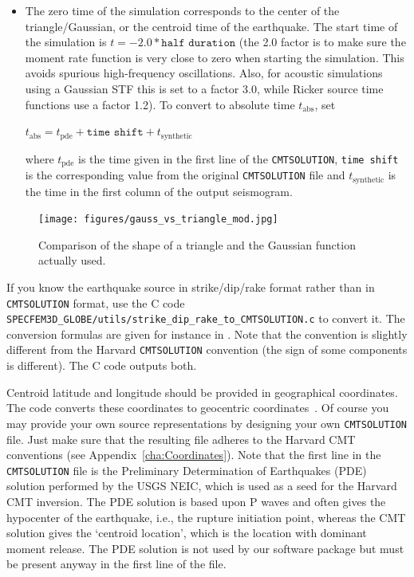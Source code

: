 \begin{itemize}
\item The zero time of the simulation corresponds to the center of the triangle/Gaussian,
or the centroid time of the earthquake. The start time of the simulation
is $t=-2.0*\texttt{half duration}$ (the 2.0 factor is to make sure the moment
rate function is very close to zero when starting the simulation. This avoids spurious high-frequency oscillations.
Also, for acoustic simulations using a Gaussian STF this is set to a factor 3.0, while Ricker source time functions use a factor 1.2).
To convert to absolute time $t_{\mathrm{abs}}$, set
%
\begin{lyxcode}
$t_{\mathrm{abs}}=t_{\mathrm{pde}}+\texttt{time shift}+t_{\mathrm{synthetic}}$
\end{lyxcode}

where $t_{\mathrm{pde}}$ is the time given in the first line of the
\texttt{CMTSOLUTION}, \texttt{time shift} is the corresponding value
from the original \texttt{CMTSOLUTION} file and $t_{\mathrm{synthetic}}$
is the time in the first column of the output seismogram.
\end{itemize}
%
\begin{figure}[htp]
\begin{centering}
\texttt{[image: figures/gauss\_vs\_triangle\_mod.jpg]}
\par
\end{centering}
\caption{Comparison of the shape of a triangle and the Gaussian function actually used.}
\label{fig:gauss.vs.triangle}
\end{figure}


If you know the earthquake source in strike/dip/rake format rather
than in \texttt{CMTSOLUTION} format, use the C code \texttt{SPECFEM3D\_GLOBE/utils/strike\_dip\_rake\_to\_CMTSOLUTION.c}
to convert it. The conversion formulas are given for instance in \citet{AkRi80}.
Note that the \citet{AkRi80} convention is slightly different from
the Harvard \texttt{CMTSOLUTION} convention (the sign of some components
is different). The C code outputs both.

Centroid latitude and longitude should be provided in geographical
coordinates. The code converts these coordinates to geocentric coordinates~\citep{DaTr98}.
Of course you may provide your own source representations by designing
your own \texttt{CMTSOLUTION} file. Just make sure that the resulting
file adheres to the Harvard CMT conventions (see Appendix~\ref{cha:Coordinates}).
Note that the first line in the \texttt{CMTSOLUTION} file is the Preliminary
Determination of Earthquakes (PDE) solution performed by the USGS
NEIC, which is used as a seed for the Harvard CMT inversion. The PDE
solution is based upon P waves and often gives the hypocenter of the
earthquake, i.e., the rupture initiation point, whereas the CMT solution
gives the `centroid location', which is the location with dominant
moment release. The PDE solution is not used by our software package
but must be present anyway in the first line of the file.

